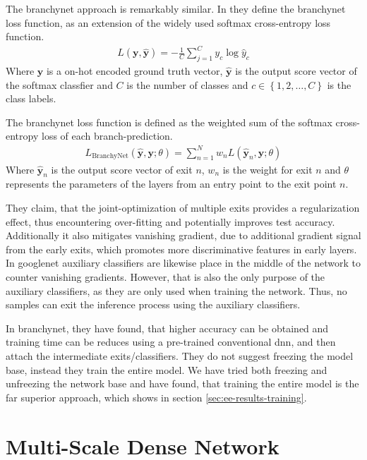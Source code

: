 The \gls{branchynet} approach is remarkably similar. In \cite{teerapittayanon_branchynet:_2016} they define the \gls{branchynet} loss function, as an extension of the widely used softmax cross-entropy loss function.
\begin{align}
L\left(\bm{y},\hat{\bm{y}}\right) = - \frac{1}{C} \sum_{j =1}^{C} y_c \log \hat{y}_c
\end{align}
 Where $ \bm{y} $ is a on-hot encoded ground truth vector, $ \bm{\hat{y}} $ is the output score vector of the softmax classfier and $ C $ is the number of classes and $ c \in \left\{1, 2,  \dots, C\right\} $ is the class labels.
	
The \gls{branchynet} loss function is defined as the weighted sum of the softmax cross-entropy loss of each branch-prediction. 
\begin{align}
	L_{\mathrm{BranchyNet}}(\hat{\bm{y}},\bm{y};\theta) = \sum_{n=1}^{N} w_n L \left(\hat{\bm{y}}_{n},\bm{y};\theta\right)
\end{align}
Where $ \bm{\hat{y}}_n $ is the output score vector of exit $ n $, $ w_n $ is the weight for exit $ n $ and $ \theta $ represents the parameters of the layers from an entry point to the exit point $ n $.

They claim, that the joint-optimization of multiple exits provides a regularization effect, thus encountering over-fitting and potentially improves test accuracy. Additionally it also mitigates vanishing gradient, due to additional gradient signal from the early exits, which promotes more discriminative features in early layers. In \gls{googlenet} \cite{szegedy_going_2015} auxiliary classifiers are likewise place in the middle of the network to counter vanishing gradients. However, that is also the only purpose of the auxiliary classifiers, as they are only used when training the network. Thus, no samples can exit the inference process using the auxiliary classifiers. 

In \gls{branchynet}, they have found, that higher accuracy can be obtained and training time can be reduces using a pre-trained conventional \gls{dnn}, and then attach the intermediate exits/classifiers. They do not suggest freezing the model base, instead they train the entire model. We have tried both freezing and unfreezing the network base and have found, that training the entire model is the far superior approach, which shows in section \ref{sec:ee-results-training}.

\section{Multi-Scale Dense Network} \label{sec:ee-msdnet}

